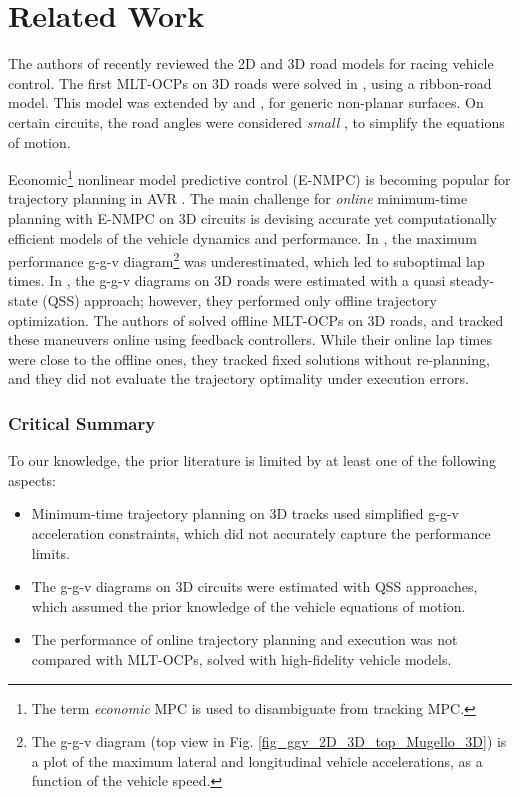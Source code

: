 \section{Related Work}
\label{sec_related_work}
%
The authors of \cite{Limebeer2023reviewroad} recently reviewed the 2D and 3D road models for racing vehicle control.
The first MLT-OCPs on 3D roads were solved in \cite{Lot2014,Limebeer2015}, using a ribbon-road model. This model was extended by \cite{Lovato2021,Limebeer2023} and \cite{Fork2024,Fork2021}, for generic non-planar surfaces.
On certain circuits, the road angles were considered \textit{small} \cite{Lot2014,Leonelli2020,Lovato2022,Lovato2022b}, to simplify the equations of motion.

Economic\footnote{The term \textit{economic} MPC is used to disambiguate from tracking MPC.} nonlinear model predictive control (E-NMPC) is becoming popular for trajectory planning in AVR \cite{Betz2022,Piccinini2020,Rowold2023,Piccinini2024_primitives}.
The main challenge for \textit{online} minimum-time planning with E-NMPC on 3D circuits is devising accurate yet computationally efficient models of the vehicle dynamics and performance.
In \cite{Rowold2023,Ogretmen2024}, the maximum performance g-g-v diagram\footnote{The g-g-v diagram (top view in Fig. \ref{fig_ggv_2D_3D_top_Mugello_3D}) is a plot of the maximum lateral and longitudinal vehicle accelerations, as a function of the vehicle speed.} was underestimated, which led to suboptimal lap times. In \cite{Lovato2022,Lovato2022b}, the g-g-v diagrams on 3D roads were estimated with a quasi steady-state (QSS) approach; however, they performed only offline trajectory optimization.
The authors of \cite{subosits2021impacts} solved offline MLT-OCPs on 3D roads, and tracked these maneuvers online using feedback controllers. While their online lap times were close to the offline ones, they tracked fixed solutions without re-planning, and they did not evaluate the trajectory optimality under execution errors.
%
\subsubsection*{Critical Summary}
%
To our knowledge, the prior literature is limited by at least one of the following aspects:
%
\begin{itemize}
	\item Minimum-time trajectory planning on 3D tracks used simplified g-g-v acceleration constraints, which did not accurately capture the performance limits.
	\item The g-g-v diagrams on 3D circuits were estimated with QSS approaches, which assumed the prior knowledge of the vehicle equations of motion.
	\item The performance of online trajectory planning and execution was not compared with MLT-OCPs, solved with high-fidelity vehicle models.
\end{itemize}
%